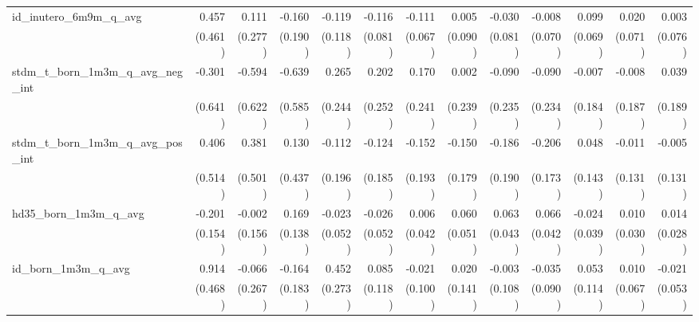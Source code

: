 \begin{tabular}{lrrrrrrrrrrrr}
id\_inutero\_6m9m\_q\_avg                   &        0.457 &        0.111 &       -0.160 &       -0.119 &       -0.116 &       -0.111 &        0.005 &       -0.030 &       -0.008 &        0.099 &        0.020 &        0.003 \\ 
                                            &      (0.461) &      (0.277) &      (0.190) &      (0.118) &      (0.081) &      (0.067) &      (0.090) &      (0.081) &      (0.070) &      (0.069) &      (0.071) &      (0.076) \\ 
stdm\_t\_born\_1m3m\_q\_avg\_neg\_int       &       -0.301 &       -0.594 &       -0.639 &        0.265 &        0.202 &        0.170 &        0.002 &       -0.090 &       -0.090 &       -0.007 &       -0.008 &        0.039 \\ 
                                            &      (0.641) &      (0.622) &      (0.585) &      (0.244) &      (0.252) &      (0.241) &      (0.239) &      (0.235) &      (0.234) &      (0.184) &      (0.187) &      (0.189) \\ 
stdm\_t\_born\_1m3m\_q\_avg\_pos\_int       &        0.406 &        0.381 &        0.130 &       -0.112 &       -0.124 &       -0.152 &       -0.150 &       -0.186 &       -0.206 &        0.048 &       -0.011 &       -0.005 \\ 
                                            &      (0.514) &      (0.501) &      (0.437) &      (0.196) &      (0.185) &      (0.193) &      (0.179) &      (0.190) &      (0.173) &      (0.143) &      (0.131) &      (0.131) \\ 
hd35\_born\_1m3m\_q\_avg                    &       -0.201 &       -0.002 &        0.169 &       -0.023 &       -0.026 &        0.006 &        0.060 &        0.063 &        0.066 &       -0.024 &        0.010 &        0.014 \\ 
                                            &      (0.154) &      (0.156) &      (0.138) &      (0.052) &      (0.052) &      (0.042) &      (0.051) &      (0.043) &      (0.042) &      (0.039) &      (0.030) &      (0.028) \\ 
id\_born\_1m3m\_q\_avg                      &        0.914 &       -0.066 &       -0.164 &        0.452 &        0.085 &       -0.021 &        0.020 &       -0.003 &       -0.035 &        0.053 &        0.010 &       -0.021 \\ 
                                            &      (0.468) &      (0.267) &      (0.183) &      (0.273) &      (0.118) &      (0.100) &      (0.141) &      (0.108) &      (0.090) &      (0.114) &      (0.067) &      (0.053) \\ 

\end{tabular}
